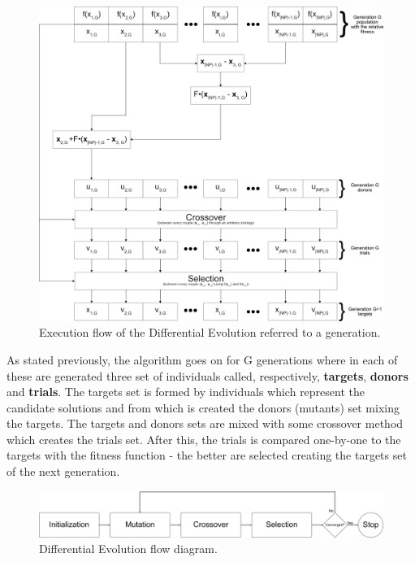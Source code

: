 \begin{figure}[h]
	\centering
	\includegraphics[width=\textwidth]{figures/de-flow-complete.png}
	\caption{Execution flow of the Differential Evolution referred to a generation.}
	\label{fig:bin-crossover}
\end{figure}
As stated previously, the algorithm goes on for G generations where in each of these are generated three set of individuals called, respectively, \textbf{targets}, \textbf{donors} and \textbf{trials}. The targets set is formed by individuals which represent the candidate solutions and from which is created the donors (mutants) set mixing the targets. The targets and donors sets are mixed with some crossover method which creates the trials set. After this, the trials is compared one-by-one to the targets with the fitness function - the better are selected creating the targets set of the next generation. \\

\begin{figure}[t]
	\centering
	\includegraphics[width=\textwidth]{figures/de-flow.png}
	\caption{Differential Evolution flow diagram.}
\end{figure}

